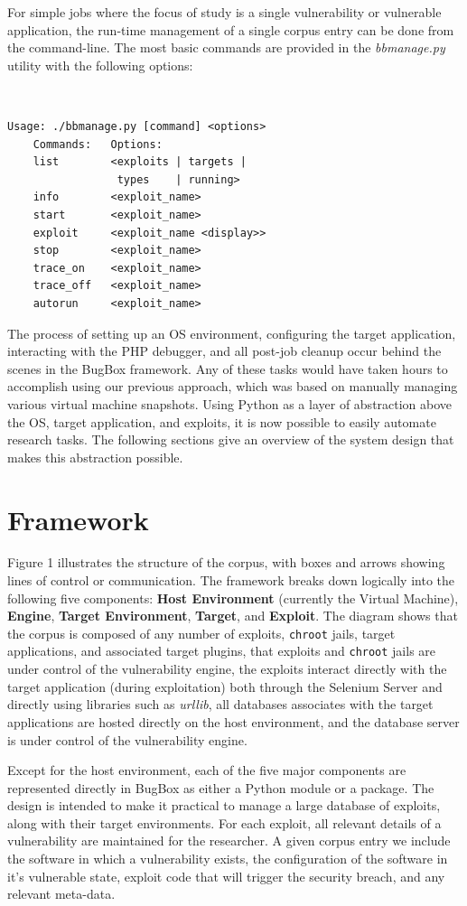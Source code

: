 \documentclass[letterpaper,twocolumn,10pt]{article}
\begin{document}
For simple jobs where the focus of study is a single vulnerability or vulnerable application, the run-time management of a single corpus entry can be done from the command-line. The most basic commands are provided in the \emph{bbmanage.py} utility with the following options:

{\tt \footnotesize
\begin{verbatim}
Usage: ./bbmanage.py [command] <options>
    Commands:   Options:
    list        <exploits | targets | 
                 types    | running>
    info        <exploit_name>
    start       <exploit_name>
    exploit     <exploit_name <display>>
    stop        <exploit_name>
    trace_on    <exploit_name>
    trace_off   <exploit_name>
    autorun     <exploit_name>
\end{verbatim}
}

The process of setting up an OS environment, configuring the target application, interacting with the PHP debugger, and all post-job cleanup occur behind the scenes in the BugBox framework. Any of these tasks would have taken hours to accomplish using our previous approach, which was based on manually managing various virtual machine snapshots. Using Python as a layer of abstraction above the OS, target application, and exploits, it is now possible to easily automate research tasks. The following sections give an overview of the system design that makes this abstraction possible.

\section{Framework}

Figure 1 illustrates the structure of the corpus, with boxes and arrows showing lines of control or communication. The framework breaks down logically into the following five components: {\bf Host Environment} (currently the Virtual Machine), {\bf Engine}, {\bf Target Environment}, {\bf Target}, and {\bf Exploit}. The diagram shows that the corpus is composed of any number of exploits, {\tt chroot} jails, target applications, and associated target plugins, that exploits and {\tt chroot} jails are under control of the vulnerability engine, the exploits interact directly with the target application (during exploitation) both through the Selenium Server and directly using libraries such as \emph{urllib}, all databases associates with the target applications are hosted directly on the host environment, and the database server is under control of the vulnerability engine.\par
Except for the host environment, each of the five major components are represented directly in BugBox as either a Python module or a package. The design is intended to make it practical to manage a large database of exploits, along with their target environments. For each exploit, all relevant details of a vulnerability are maintained for the researcher. A given corpus entry we include the software in which a vulnerability exists, the configuration of the software in it's vulnerable state, exploit code that will trigger the security breach, and any relevant meta-data.\par
\end{document}
